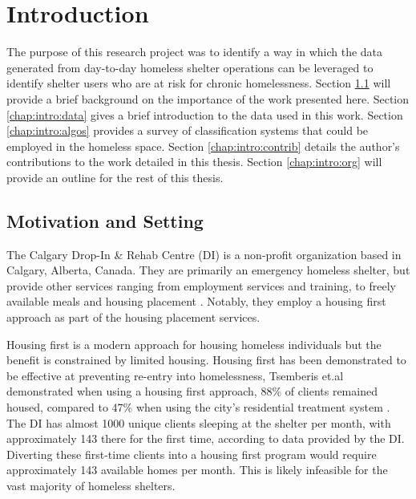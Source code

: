 \chapter{Introduction} \label{chap:intro}

The purpose of this research project was to identify a way in which the data generated from day-to-day homeless shelter operations can be leveraged to identify shelter users who are at risk for chronic homelessness. 
Section \ref{chap:intro:motivation} will provide a brief background on the importance of the work presented here.
Section \ref{chap:intro:data} gives a brief introduction to the data used in this work.
Section \ref{chap:intro:algos} provides a survey of classification systems that could be employed in the homeless space.
Section \ref{chap:intro:contrib} details the author's contributions to the work detailed in this thesis.
Section \ref{chap:intro:org} will provide an outline for the rest of this thesis.

\section{Motivation and Setting} \label{chap:intro:motivation}


The Calgary Drop-In \& Rehab Centre (DI) is a non-profit organization based in  Calgary, Alberta, Canada. They are primarily an emergency homeless shelter, but provide other services ranging from employment services and training, to freely available meals and housing placement \cite{di_2020}. Notably, they employ a housing first approach as part of the housing placement services.

Housing first is a modern approach for housing homeless individuals but the benefit is constrained by limited housing. Housing first has been demonstrated to be effective at preventing re-entry into homelessness, Tsemberis et.al demonstrated when using a housing first approach, 88\% of clients remained housed, compared to 47\% when using the city's residential treatment system \cite{tsemberis2000housingfirst}.
The DI has almost 1000 unique clients sleeping at the shelter per month, with approximately 143 there for the first time, according to data provided by the DI. Diverting these first-time clients into a housing first program would require approximately 143 available homes per month. This is likely infeasible for the vast majority of homeless shelters.

